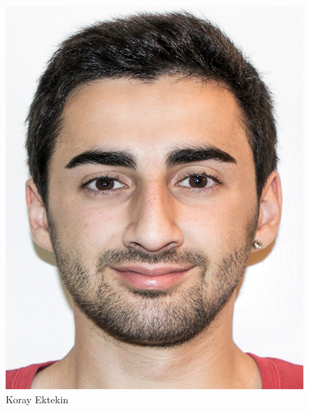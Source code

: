 \begin{figure}[htb]
\begin{minipage}{0.45\linewidth}
		\includegraphics[scale=0.9]{content/pictures/Koray.jpg}
		\caption{Koray Ektekin}
		\vspace{30pt}
	\end{minipage}
\end{figure}
